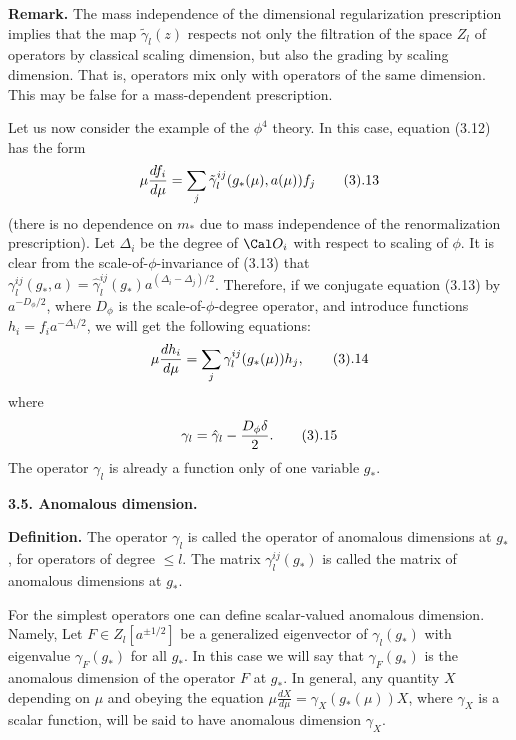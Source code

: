 {\bf Remark.} 
The mass independence of the dimensional regularization prescription
implies that 
the map $\tilde\gamma_l(z)$ respects not only
the filtration of the space $Z_l$ of operators by classical 
scaling dimension, but also 
the grading by scaling dimension. That is, operators mix only with operators 
of the same dimension. This may be false for a mass-dependent prescription.  

Let us now consider the example of the $\phi^4$ theory. 
In this case, 
equation (3.12) has the form
$$
\mu\frac{d f_i}{d \mu}=\sum_j\tilde\gamma_l^{ij}(g_*(\mu),a(\mu))f_j
\tag 3.13
$$
(there is no dependence on $m_*$ due to mass independence of the 
renormalization
prescription).
Let $\Delta_i$ be the degree of $\O_i$ with respect to scaling of $\phi$. 
It is clear from the scale-of-$\phi$-invariance of (3.13) that
$\gamma_l^{ij}(g_*,a)=\hat\gamma_{l}^{ij}(g_*)a^{(\Delta_i-\Delta_j)/2}$.
Therefore, if we conjugate equation (3.13) by 
$a^{-D_\phi/2}$, where $D_\phi$ is the scale-of-$\phi$-degree 
operator, and introduce functions $h_i=f_ia^{-\Delta_i/2}$, we will get
the following equations:
$$
\mu\frac{d h_i}{d \mu}=\sum_j\gamma_l^{ij}(g_*(\mu))h_j,
\tag 3.14
$$
where $$
\gamma_l=\hat\gamma_l-\frac{D_\phi\delta}{2}.\tag 3.15
$$ 
The operator $\gamma_l$ is already a function only of one variable
$g_*$. 

{\bf 3.5. Anomalous dimension.}

{\bf Definition.} The operator $\gamma_l$ is called the 
operator of anomalous dimensions at $g_*$,
for operators of degree $\le l$. The matrix $\gamma_l^{ij}(g_*)$
is called the matrix of anomalous dimensions at $g_*$. 

For the simplest operators one can define scalar-valued
anomalous dimension. Namely, Let $F\in Z_l[a^{\pm 1/2}]$  
be a generalized eigenvector of $\gamma_l(g_*)$ with eigenvalue 
$\gamma_F(g_*)$ for all $g_*$. In this case we will say 
that $\gamma_F(g_*)$ is the anomalous dimension of 
the operator $F$ at $g_*$. In general, any quantity $X$ 
depending on $\mu$ and obeying the equation
$\mu\frac{d X}{d\mu}=\gamma_X(g_*(\mu))X$, where
$\gamma_X$ is a scalar function, will be said to have 
anomalous dimension $\gamma_X$. 

